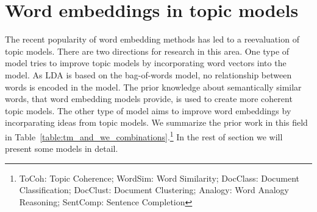 \documentclass[
        a4paper,
        titlepage,
        twoside,
        parskip
        ]{scrbook}
\theoremstyle{break}
\begin{document}
\section{Word embeddings in topic models}
The recent popularity of word embedding methods has led to a reevaluation of topic models.
There are two directions for research in this area.
One type of model tries to improve topic models by incorporating word vectors into the model.
As LDA is based on the bag-of-words model, no relationship between words is encoded in the model.
The prior knowledge about semantically similar words, that word embedding models provide, is used to create more coherent topic models.
The other type of model aims to improve word embeddings by incorparating ideas from topic models.
We summarize the prior work in this field in Table~\ref{table:tm_and_we_combinations}.\footnote{ToCoh: Topic Coherence; WordSim: Word Similarity; DocClass: Document Classification; DocClust: Document Clustering; Analogy: Word Analogy Reasoning; SentComp: Sentence Completion}
In the rest of section we will present some models in detail.
\end{document}

